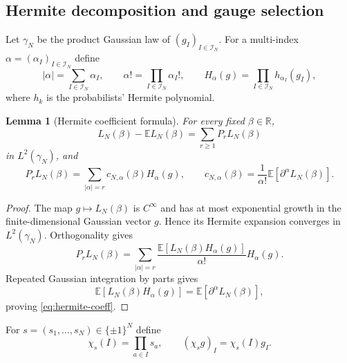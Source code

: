 \documentclass[11pt]{article}
\newtheorem{lemma}[theorem]{Lemma}
\newcommand{\E}{\mathbb{E}}
\newcommand{\R}{\mathbb{R}}
\newcommand{\calI}{\mathcal{I}}
\begin{document}
\subsection{Hermite decomposition and gauge selection}

Let $\gamma_N$ be the product Gaussian law of $(g_I)_{I\in\calI_N}$.  For a
multi-index $\alpha=(\alpha_I)_{I\in\calI_N}$ define
\begin{equation}\label{eq:multi-index}
  |\alpha|=\sum_{I\in\calI_N}\alpha_I,
  \qquad
  \alpha!=\prod_{I\in\calI_N}\alpha_I!,
  \qquad
  H_\alpha(g)=\prod_{I\in\calI_N}h_{\alpha_I}(g_I),
\end{equation}
where $h_k$ is the probabilists' Hermite polynomial.

\begin{lemma}[Hermite coefficient formula]\label{lem:hermite-coeff}
  For every fixed $\beta\in\R$,
  \begin{equation}\label{eq:chaos-decomposition}
    L_N(\beta)-\E L_N(\beta)
    =
    \sum_{r\geq1}P_rL_N(\beta)
  \end{equation}
  in $L^2(\gamma_N)$, and
  \begin{equation}\label{eq:hermite-coeff}
    P_rL_N(\beta)
    =
    \sum_{|\alpha|=r}c_{N,\alpha}(\beta)H_\alpha(g),
    \qquad
    c_{N,\alpha}(\beta)
    =
    \frac1{\alpha!}\E[\partial^\alpha L_N(\beta)].
  \end{equation}
\end{lemma}

\begin{proof}
  The map $g\mapsto L_N(\beta)$ is $C^\infty$ and has at most exponential
  growth in the finite-dimensional Gaussian vector $g$.  Hence its Hermite
  expansion converges in $L^2(\gamma_N)$.  Orthogonality gives
  \begin{equation}\label{eq:hermite-projection}
    P_rL_N(\beta)
    =
    \sum_{|\alpha|=r}
    \frac{\E[L_N(\beta)H_\alpha(g)]}{\alpha!}H_\alpha(g).
  \end{equation}
  Repeated Gaussian integration by parts gives
  \begin{equation}\label{eq:gibp-hermite}
    \E[L_N(\beta)H_\alpha(g)]=\E[\partial^\alpha L_N(\beta)],
  \end{equation}
  proving \eqref{eq:hermite-coeff}.
\end{proof}

For $s=(s_1,\ldots,s_N)\in\{\pm1\}^N$ define
\begin{equation}\label{eq:chi-s}
  \chi_s(I)=\prod_{a\in I}s_a,
  \qquad
  (\chi_sg)_I=\chi_s(I)g_I.
\end{equation}
\end{document}
